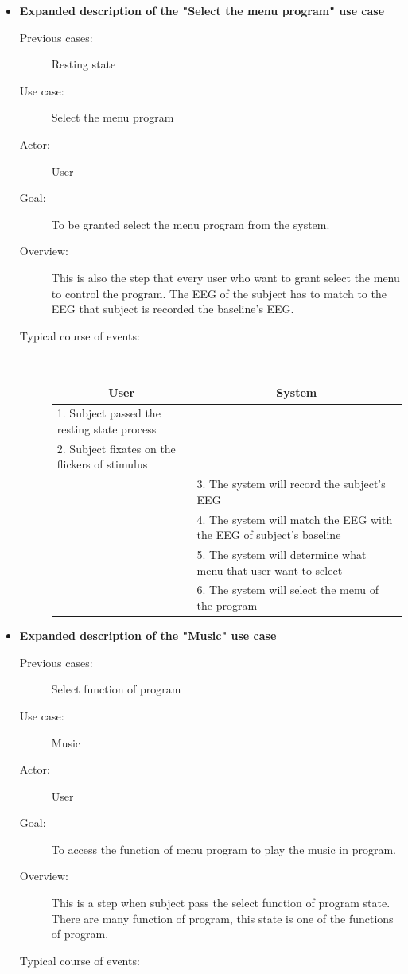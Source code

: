 \begin{itemize}
\begin{description}
{\begin{tabular}{| m{.47\linewidth} | m{.47\linewidth} |}
		\end{tabular}
	}
	
\end{description}

\newpage
\item \textbf{Expanded description of the "Select the menu program" use case }
\begin{description}
	\item [Previous cases:] Resting state
	\item [Use case:] Select the menu program
	\item [Actor:] User  
	\item [Goal:] To be granted select the menu program from the system. 
	\item [Overview:] This is also the step that every user who want to grant select the menu to control the program. The EEG of the subject has to match to the EEG that subject is recorded the baseline’s EEG.
	\item [Typical course of events:]~
	
	{
		\centering
		\begin{tabular}{| m{.47\linewidth} | m{.47\linewidth} |}
			
			\hline 
			\multicolumn{1}{|c}{\textbf{User}} & 
  			\multicolumn{1}{|c|}{\textbf{System}}\\
			\hline 
			1. Subject passed the resting state process &   \\
			\hline 
			2. Subject fixates on the flickers of stimulus   &   \\
			\hline 
			& 3. The system will record the subject's EEG \\
			\hline 
			& 4. The system will match the EEG with the EEG of subject's baseline  \\
			\hline
			& 5. The system will determine what menu that user want to select \\
			\hline
			& 6. The system will select the menu of the program\\
			\hline
			
		\end{tabular}
	}
	
\end{description}

\newpage
\item \textbf{Expanded description of the "Music" use case }
\begin{description}
	\item [Previous cases:] Select function of program
	\item [Use case:] Music
	\item [Actor:] User  
	\item [Goal:] To access the function of menu program to play the music in program. 
	\item [Overview:] This is a step when subject pass the select function of program state. There are many function of program, this state is one of the functions of program. 
	\item [Typical course of events:]~
	

\end{description}
\end{itemize}
